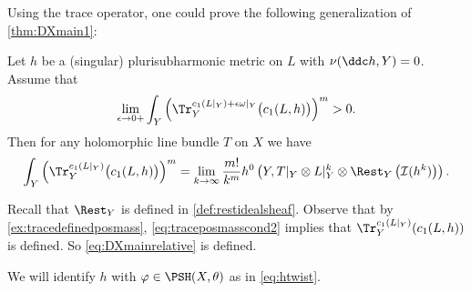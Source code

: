 Using the trace operator, one could prove the following generalization of \cref{thm:DXmain1}:
\begin{theorem}\label{thm:rest_volume}
Let $h$ be a (singular) plurisubharmonic metric on $L$ with $\nu(\ddc h,Y)=0$. Assume that
\begin{equation}\label{eq:traceposmasscond2}
    \lim_{\epsilon\to 0+} \int_Y\left(\Tr_Y^{c_1(L|_Y)+\epsilon\omega|_Y}\bigl(c_1(L,h)\bigr) \right)^m>0.
\end{equation}
Then for any holomorphic line bundle $T$ on $X$ we have
\begin{equation}\label{eq:DXmainrelative}
    \int_Y \left(\Tr_Y^{c_1(L|_Y)}\bigl(c_1(L,h)\bigr)\right)^m = \lim_{k \to \infty} \frac{m!}{k^m} h^0\left(Y,T|_Y\otimes L|_Y^k \otimes \Rest_Y\left(\mathcal{I}(h^{k})\right) \right).
\end{equation}
\end{theorem}
Recall that $\Rest_Y$ is defined in \cref{def:restidealsheaf}. Observe that by \cref{ex:tracedefinedposmass}, \eqref{eq:traceposmasscond2} implies that $\Tr_Y^{c_1(L|_Y)}(c_1(L,h))$ is defined. So \eqref{eq:DXmainrelative} is defined.

We will identify $h$ with $\varphi\in \PSH(X,\theta)$ as in \eqref{eq:htwist}.

